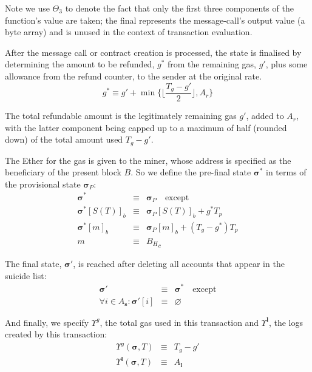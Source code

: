 \documentclass[UTF8,nofonts]{ctexart}
\begin{document}
\begin{multicols}{2}
Note we use $\Theta_{3}$ to denote the fact that only the first three components of the function's value are taken; the final represents the message-call's output value (a byte array) and is unused in the context of transaction evaluation.

After the message call or contract creation is processed, the state is finalised by determining the amount to be refunded, $g^*$ from the remaining gas, $g'$, plus some allowance from the refund counter, to the sender at the original rate.
\begin{equation}
g^* \equiv g' + \min \{ \Big\lfloor \dfrac{T_g - g'}{2} \Big\rfloor, A_r \}
\end{equation}

The total refundable amount is the legitimately remaining gas $g'$, added to $A_r$, with the latter component being capped up to a maximum of half (rounded down) of the total amount used $T_g - g'$.

The Ether for the gas is given to the miner, whose address is specified as the beneficiary of the present block $B$. So we define the pre-final state $\boldsymbol{\sigma}^*$ in terms of the provisional state $\boldsymbol{\sigma}_P$:
\begin{eqnarray}
\boldsymbol{\sigma}^* & \equiv & \boldsymbol{\sigma}_P \quad \text{except} \\
\boldsymbol{\sigma}^*[S(T)]_b & \equiv & \boldsymbol{\sigma}_P[S(T)]_b + g^* T_p \\
\boldsymbol{\sigma}^*[m]_b & \equiv & \boldsymbol{\sigma}_P[m]_b + (T_g - g^*) T_p \\
m & \equiv & {B_H}_c
\end{eqnarray}

The final state, $\boldsymbol{\sigma}'$, is reached after deleting all accounts that appear in the suicide list:
\begin{eqnarray}
\boldsymbol{\sigma}' & \equiv & \boldsymbol{\sigma}^* \quad \text{except} \\
\forall i \in A_\mathbf{s}: \boldsymbol{\sigma}'[i] & \equiv & \varnothing
\end{eqnarray}

And finally, we specify $\Upsilon^g$, the total gas used in this transaction and $\Upsilon^\mathbf{l}$, the logs created by this transaction:
\begin{eqnarray}
\Upsilon^g(\boldsymbol{\sigma}, T) & \equiv & T_g - g' \\
\Upsilon^\mathbf{l}(\boldsymbol{\sigma}, T) & \equiv & A_\mathbf{l}
\end{eqnarray}


\end{multicols}
\end{document}
